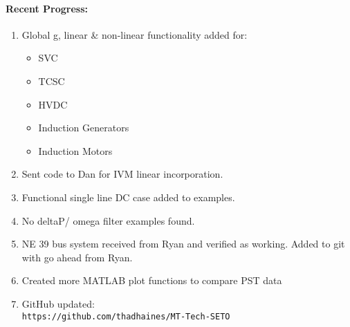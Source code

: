 \documentclass[12pt]{article}
\begin{document}
\begin{multicols}{2}
\raggedright

\paragraph{Recent Progress:}
	\begin{enumerate}
		\itemsep0em 
		\item Global g, linear \& non-linear functionality added for:
		\begin{minipage}{\linewidth}
		\begin{multicols}{2}
				\begin{itemize}
		\itemsep0em 
				\footnotesize
					\item SVC
					\item TCSC
					\item HVDC
					\item Induction Generators
					\item Induction Motors
				\end{itemize}
		\end{multicols}
		\end{minipage}
		\item Sent code to Dan for IVM linear incorporation.
		\item Functional single line DC case added to examples.
		\item No deltaP/ omega filter examples found.
		\item NE 39 bus system received from Ryan and verified as working. Added to git with go ahead from Ryan.
		
		\item Created more MATLAB plot functions to compare PST data
		\item GitHub updated:\\
	{\footnotesize	\verb|https://github.com/thadhaines/MT-Tech-SETO| }\\
	\end{enumerate}
	


\end{multicols}
\end{document}
